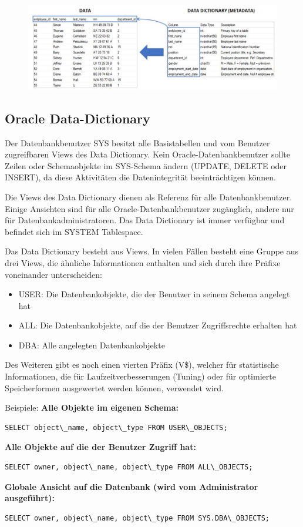 \begin{figure}[H]
    \centering
    \includegraphics[width=.8\textwidth]{Content/images/modellierung/data.png}
    \caption{}
    \label{fig:modellierung:data}
\end{figure}

\subsection{Oracle Data-Dictionary}

Der Datenbankbenutzer SYS besitzt alle Basistabellen und vom Benutzer zugreifbaren Views des Data Dictionary.
Kein Oracle-Datenbankbenutzer sollte Zeilen oder Schemaobjekte im SYS-Schema ändern (UPDATE, DELETE oder INSERT), da diese Aktivitäten die Datenintegrität beeinträchtigen können.

Die Views des Data Dictionary dienen als Referenz für alle Datenbankbenutzer. Einige Ansichten sind für alle Oracle-Datenbankbenutzer zugänglich, andere nur für Datenbankadministratoren. 
Das Data Dictionary ist immer verfügbar und befindet sich im SYSTEM Tablespace.

Das Data Dictionary besteht aus Views. In vielen Fällen besteht eine Gruppe aus drei Views, die ähnliche Informationen enthalten und sich durch ihre Präfixe voneinander unterscheiden:

\begin{itemize}
    \item USER: Die Datenbankobjekte, die der Benutzer in seinem Schema angelegt hat
    \item ALL: Die Datenbankobjekte, auf die der Benutzer Zugriffsrechte erhalten hat 
    \item DBA: Alle angelegten Datenbankobjekte
\end{itemize}

Des Weiteren gibt es noch einen vierten Präfix (V\$), welcher für statistische Informationen, die für Laufzeitverbesserungen (Tuning) oder für optimierte Speicherformen ausgewertet werden können, verwendet wird.

Beispiele:
\textbf{Alle Objekte im eigenen Schema:}
\begin{lstlisting}
SELECT object\_name, object\_type FROM USER\_OBJECTS;    
\end{lstlisting}
\textbf{Alle Objekte auf die der Benutzer Zugriff hat:}
\begin{lstlisting}
SELECT owner, object\_name, object\_type FROM ALL\_OBJECTS;
\end{lstlisting}
\textbf{Globale Ansicht auf die Datenbank (wird vom Administrator ausgeführt):}
\begin{lstlisting}
SELECT owner, object\_name, object\_type FROM SYS.DBA\_OBJECTS;
\end{lstlisting}

